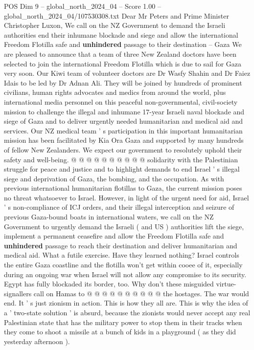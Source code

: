 \begin{textsample}{POS Dim 9 – global\_north\_2024\_04 – Score 1.00 – global\_north\_2024\_04/107530308.txt}  \label{ex:f9_pos_232}
Dear Mr Peters and Prime Minister Christopher Luxon, We call on the NZ Government to demand the Israeli authorities end their inhumane blockade and siege and allow the international Freedom Flotilla safe and \textbf{unhindered} passage to their destination -- Gaza We are pleased to announce that a team of three New Zealand doctors have been selected to join the international Freedom Flotilla which is due to sail for Gaza very soon.
Our Kiwi team of volunteer doctors are Dr Wasfy Shahin and Dr Faiez Idais to be led by Dr Adnan Ali.
They will be joined by hundreds of prominent civilians, human rights advocates and medics from around the world, plus international media personnel on this peaceful non-governmental, civil-society mission to challenge the illegal and inhumane 17-year Israeli naval blockade and siege of Gaza and to deliver urgently needed humanitarian and medical aid and services.
Our NZ medical team ' s participation in this important humanitarian mission has been facilitated by Kia Ora Gaza and supported by many hundreds of fellow New Zealanders.
We expect our government to resolutely uphold their safety and well-being. @ @ @ @ @ @ @ @ @ @ solidarity with the Palestinian struggle for peace and justice and to highlight demands to end Israel ' s illegal siege and deprivation of Gaza, the bombing, and the occupation.
As with previous international humanitarian flotillas to Gaza, the current mission poses no threat whatsoever to Israel.
However, in light of the urgent need for aid, Israel ' s non-compliance of ICJ orders, and their illegal interception and seizure of previous Gaza-bound boats in international waters, we call on the NZ Government to urgently demand the Israeli ( and US ) authorities lift the siege, implement a permanent ceasefire and allow the Freedom Flotilla safe and \textbf{unhindered} passage to reach their destination and deliver humanitarian and medical aid.
What a futile exercise.
Have they learned nothing?
Israel controls the entire Gaza coastline and the flotilla won't get within cooee of it, especially during an ongoing war when Israel will not allow any compromise to its security.
Egypt has fully blockaded its border, too.
Why don't these misguided virtue-signallers call on Hamas to @ @ @ @ @ @ @ @ @ @ the hostages.
The war would end.
It ' s just zionism in action.
This is how they all are.
This is why the idea of a ' two-state solution ' is absurd, because the zionists would never accept any real Palestinian state that has the military power to stop them in their tracks when they come to shoot a missile at a bunch of kids in a playground ( as they did yesterday afternoon ).

\end{textsample}
